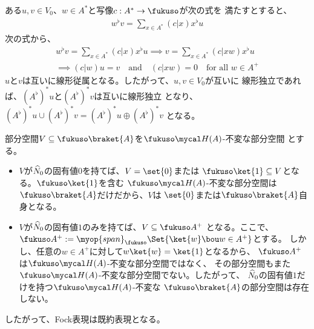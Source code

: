 {	\begin{note}[真空の独立性]\label{note:真空の独立性} %
		ある$u,v\in V_0$、$w\in A^*$と写像$c:A^*\to\fukuso$が次の式を
		満たすとすると、
		\begin{equation*}\begin{split}
			w^\flat v = \sum_{x\in A^*} (c|x)x^\flat u
		\end{split}\end{equation*}
		次の式から、
		\begin{equation*}\begin{split}
			w^\flat v = \sum_{x\in A^*} (c|x)x^\flat u
			\implies v = \sum_{x\in A^*} (c|xw)x^\flat u \\
			\implies (c|w) u = v \quad\text{and}\quad
			(c|xw) = 0 \quad\text{for all } w\in A^+
		\end{split}\end{equation*}
		$u$と$v$は互いに線形従属となる。したがって、$u,v\in V_0$が互いに
		線形独立であれば、$(A^\flat)^*u$と$(A^\flat)^*v$は互いに線形独立
		となり、$(A^\flat)^*u\cup(A^\flat)^*v=(A^\flat)^*u\oplus(A^\flat)^*v$
		となる。
	\end{note} %

	\begin{note}[Fock表現の既約性]\label{note:Fock表現の既約性} %
		部分空間$V\subseteq\fukuso\braket{A}$を$\fukuso\Eta(A)$-不変な部分空間
		とする。
		\begin{itemize}\setlength{\itemsep}{-1mm} %
			\item $V$が$\widehat{N}_0$の固有値$0$を持てば、$V=\set{0}$または
			$\fukuso\ket{1}\subseteq V$となる。$\fukuso\ket{1}$を含む
			$\fukuso\Eta(A)$-不変な部分空間は$\fukuso\braket{A}$だけだから、$V$は
			$\set{0}$または$\fukuso\braket{A}$自身となる。
			\item $V$が$\widehat{N}_0$の固有値$1$のみを持てば、$V\subseteq\fukuso A^+$
			となる。ここで、
			$\fukuso A^+:=\myop{span}_\fukuso\Set{\ket{w}\bou w\in A^+}$とする。
			しかし、任意の$w\in A^+$に対して$w\ket{w}=\ket{1}$となるから、
			$\fukuso A^+$は$\fukuso\Eta(A)$-不変な部分空間ではなく、
			その部分空間もまた$\fukuso\Eta(A)$-不変な部分空間でない。したがって、
			$\widehat{N}_0$の固有値$1$だけを持つ$\fukuso\Eta(A)$-不変な
			$\fukuso\braket{A}$の部分空間は存在しない。
		\end{itemize} %
		したがって、Fock表現は既約表現となる。
	\end{note} %

}
